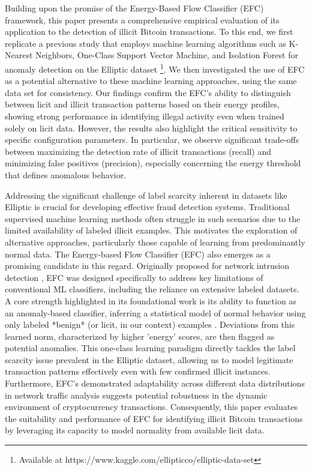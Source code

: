 Building upon the promise of the Energy-Based Flow Classifier (EFC) framework, this paper presents a comprehensive empirical
evaluation of its application to the detection of illicit Bitcoin transactions. To this end, we first replicate a previous
study that employs machine learning algorithms such as K-Nearest Neighbors, One-Class Support Vector Machine, and Isolation
Forest for anomaly detection on the Elliptic dataset \footnote{Available at https://www.kaggle.com/ellipticco/elliptic-data-set}.
We then investigated the use of EFC as a potential alternative to these machine learning approaches, using the same data set
for consistency. Our findings confirm the EFC's ability to distinguish between licit and illicit transaction patterns based
on their energy profiles, showing strong performance in identifying illegal activity even when trained solely on licit data.
However, the results also highlight the critical sensitivity to specific configuration parameters. In particular, we observe
significant trade-offs between maximizing the detection rate of illicit transactions (recall) and minimizing false positives
(precision), especially concerning the energy threshold that defines anomalous behavior. 

Addressing the significant challenge of label scarcity inherent in datasets like Elliptic is crucial for developing effective
fraud detection systems. Traditional supervised machine learning methods often struggle in such scenarios due to the limited
availability of labeled illicit examples. This motivates the exploration of alternative approaches, particularly those capable
of learning from predominantly normal data. The Energy-based Flow Classifier (EFC) also emerges as a promising candidate
in this regard. Originally proposed for network intrusion detection \cite{pontes2019, souza2022novelopensetenergybased},
EFC was designed specifically to address key limitations of conventional ML classifiers, including the reliance on extensive
labeled datasets. A core strength highlighted in its foundational work is its ability to function as an anomaly-based classifier,
inferring a statistical model of normal behavior using only labeled *benign* (or licit, in our context) examples
\cite{souza2022novelopensetenergybased}. Deviations from this learned norm, characterized by higher 'energy' scores, are
then flagged as potential anomalies. This one-class learning paradigm directly tackles the label scarcity issue prevalent
in the Elliptic dataset, allowing us to model legitimate transaction patterns effectively even with few confirmed illicit
instances. Furthermore, EFC's demonstrated adaptability across different data distributions in network traffic analysis
suggests potential robustness in the dynamic environment of cryptocurrency transactions. Consequently, this paper evaluates
the suitability and performance of EFC for identifying illicit Bitcoin transactions by leveraging its capacity to model
normality from available licit data.

